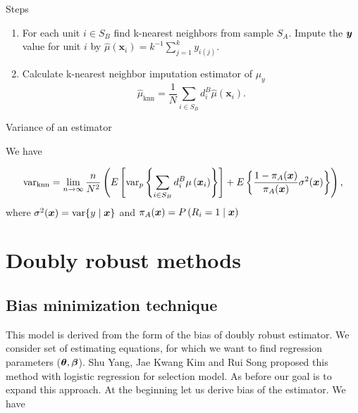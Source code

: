 \documentclass[
  letterpaper,
  DIV=11,
  numbers=noendperiod]{scrreprt}
\providecommand{\tightlist}{%
  \setlength{\itemsep}{0pt}\setlength{\parskip}{0pt}}\usepackage{longtable,booktabs,array}
\begin{document}
Steps

\begin{enumerate}
\def\labelenumi{\arabic{enumi}.}
\tightlist
\item
  For each unit \(i \in S_B\) find k-nearest neighbors from sample
  \(S_A\). Impute the \(\boldsymbol{y}\) value for unit \(i\) by
  \(\hat{\mu}\left(\mathbf{x}_i\right)=k^{-1} \sum_{j=1}^k y_{i(j)}\).
\item
  Calculate k-nearest neighbor imputation estimator of \(\mu_y\) \[
  \hat{\mu}_{\mathrm{knn}}=\frac{1}{N} \sum_{i \in S_B} d_i^B \hat{\mu}\left(\mathbf{x}_i\right) .
  \]
\end{enumerate}

Variance of an estimator

We have

\[
\text{var}_{\mathrm{knn}}=\lim _{n \rightarrow \infty} \frac{n}{N^2}\left(E\left[\operatorname{var}_p\left\{\sum_{i \in S_B} d_i^B \mu\left(\boldsymbol{x}_i\right)\right\}\right]+E\left\{\frac{1-\pi_A(\boldsymbol{x})}{\pi_A(\boldsymbol{x})} \sigma^2(\boldsymbol{x})\right\}\right),
\] where \(\sigma^2(\boldsymbol{x})=\operatorname{var}\{y \mid \boldsymbol{x}\}\) and
\(\pi_A(\boldsymbol{x}) = P\left(R_i=1 \mid \boldsymbol{x}\right)\)


\hypertarget{doubly-robust-methods}{%
\chapter{Doubly robust methods}\label{doubly-robust-methods}}

\hypertarget{bias-minimization-technique}{%
\section{Bias minimization
technique}\label{bias-minimization-technique}}

This model is derived from the form of the bias of doubly robust
estimator. We consider set of estimating equations, for which we want to
find regression parameters (\(\boldsymbol{\theta}, \boldsymbol{\beta}\)). Shu Yang, Jae Kwang
Kim and Rui Song proposed this method with logistic regression for
selection model. As before our goal is to expand this approach. At the
beginning let us derive bias of the estimator. We have
\end{document}
